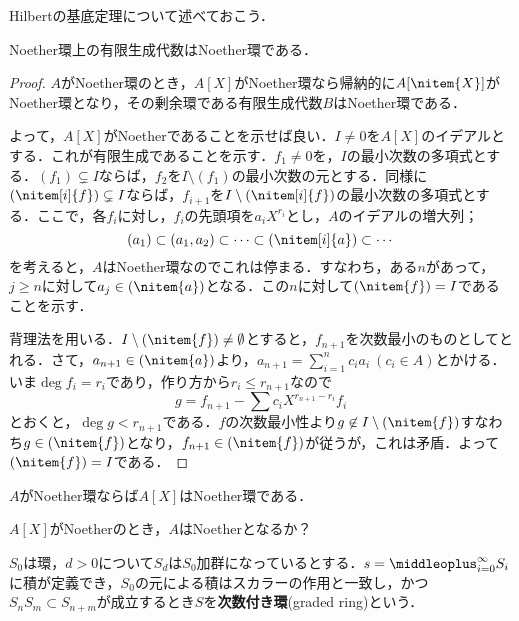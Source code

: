 Hilbertの基底定理について述べておこう．
\begin{thm}[Hilbertの基底定理]\label{thm:Hilbertの基底定理}
	Noether環上の有限生成代数はNoether環である．
\end{thm}
\begin{proof}
	$A$がNoether環のとき，$A[X]$がNoether環なら帰納的に$A[\nitem{X}]$がNoether環となり，その剰余環である有限生成代数$B$はNoether環である．
	
	よって，$A[X]$がNoetherであることを示せば良い．$I\neq0$を$A[X]$のイデアルとする．これが有限生成であることを示す．$f_1\neq0$を，$I$の最小次数の多項式とする．$(f_1)\subsetneq I$ならば，$f_2$を$I\setminus(f_1)$の最小次数の元とする．同様に$(\nitem[i]{f})\subsetneq I$ならば，$f_{i+1}$を$I\setminus(\nitem[i]{f})$の最小次数の多項式とする．ここで，各$f_i$に対し，$f_i$の先頭項を$a_iX^{r_i}$とし，$A$のイデアルの増大列；
	\[(a_1)\subset(a_1,a_2)\subset\dots\subset(\nitem[i]{a})\subset\cdots\]
	を考えると，$A$はNoether環なのでこれは停まる．すなわち，ある$n$があって，$j\geq n$に対して$a_j\in(\nitem{a})$となる．この$n$に対して$(\nitem{f})=I$であることを示す．
	
	背理法を用いる．$I\setminus(\nitem{f})\neq\emptyset$とすると，$f_{n+1}$を次数最小のものとしてとれる．さて，$a_{n+1}\in(\nitem{a})$より，$a_{n+1}=\sum_{i=1}^n c_ia_i~(c_i\in A)$とかける．いま$\deg{f_i}=r_i$であり，作り方から$r_i\leq r_{n+1}$なので
	\[g=f_{n+1}-\sum c_iX^{r_{n+1}-r_i}f_i\]
	とおくと，$\deg g<r_{n+1}$である．$f$の次数最小性より$g\not\in I\setminus(\nitem{f})$すなわち$g\in(\nitem{f})$となり，$f_{n+1}\in(\nitem{f})$が従うが，これは矛盾．よって$(\nitem{f})=I$である．
\end{proof}

\begin{cor}
	$A$がNoether環ならば$A[X]$はNoether環である．
\end{cor}

\begin{exer}
	$A[X]$がNoetherのとき，$A$はNoetherとなるか？
\end{exer}

\begin{defi}[次数付き環]
	$S_0$は環，$d>0$について$S_d$は$S_0$加群になっているとする．$s=\middleoplus_{i=0}^\infty S_i$に積が定義でき，$S_0$の元による積はスカラーの作用と一致し，かつ$S_nS_m\subset S_{n+m}$が成立するとき$S$を\textbf{次数付き環}(graded ring)という．
\end{defi}

